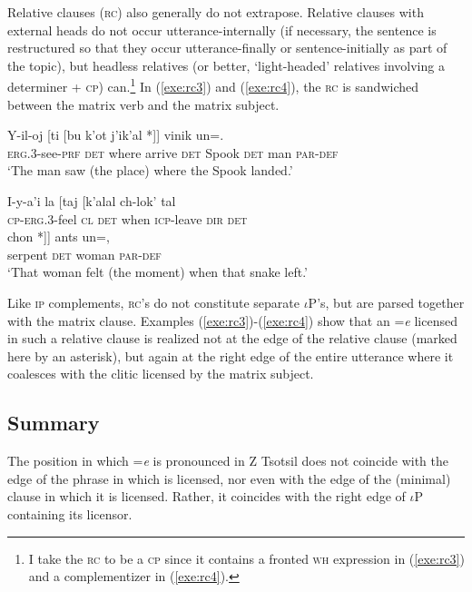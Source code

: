 \documentclass[output=paper,
modfonts
]{LSP/langsci}
\begin{document}
Relative clauses (\textsc{rc}) also generally do not extrapose. Relative clauses with external heads do not occur utterance-internally (if necessary, the sentence is restructured so that they occur utterance-finally or sentence-initially as part of the topic), but headless relatives (or better, `light-headed' relatives involving a determiner + \textsc{cp}) can.\footnote
{I take the \textsc{rc} to be a \textsc{cp} since it contains a fronted \textsc{wh} expression in (\ref{exe:rc3}) and a complementizer in (\ref{exe:rc4}).}
In (\ref{exe:rc3}) and (\ref{exe:rc4}), the \textsc{rc} is sandwiched between the matrix verb and the matrix subject. 
\begin{exe}
\ex\label{exe:rc3}\bridgeoverex
\gll Y-il-oj [ti [bu k'ot  j'ik'al *]]   vinik un=. \\
\textsc{erg.3}-see-\textsc{prf} \textsc{det} where arrive \textsc{det} Spook {} \textsc{det} man \textsc{par-def} \\
\glt `The man saw (the place) where the Spook landed.' \citep[63]{laughlin1977}
\end{exe}
\begin{exe}
\ex\label{exe:rc4}\bridgeoverex
\gll I-y-a'i la [taj [k'alal ch-lok' tal  \\
\textsc{cp-erg.3}-feel \textsc{cl} \textsc{det} when \textsc{icp}-leave \textsc{dir} \textsc{det} \\
\glt {\bridgeoverex}
\gll {\phantom{\hspace*{1in}}} chon *]]  ants un=, \\
{} serpent  {}  \textsc{det} woman \textsc{par-def} \\
\glt `That woman felt (the moment) when that snake left.'  \citep[371]{laughlin1977}
\end{exe}
Like \textsc{ip} complements, \textsc{rc}'s do not constitute separate $\iota$P's, but are parsed together with the matrix clause.  
Examples (\ref{exe:rc3})-(\ref{exe:rc4}) show that an =\emph{e} licensed in such a relative clause is realized not at the edge of the relative clause (marked here by an asterisk), but again at the right edge of the entire utterance where it coalesces with the clitic licensed by the matrix subject.

\subsection{Summary}
The position in which =\emph{e} is pronounced in Z Tsotsil does not coincide with the edge of the phrase in which is licensed, nor even 
with the edge of the (minimal) clause in which it is licensed. Rather, it  coincides with the right edge of $\iota$P containing
its licensor.  
\end{document}
